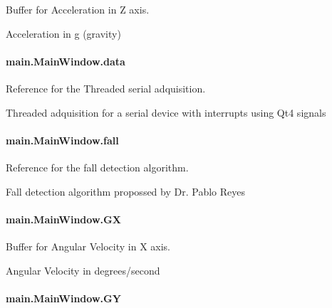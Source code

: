 Buffer for Acceleration in Z axis. 

Acceleration in g (gravity) \hypertarget{classmain_1_1_main_window_af7e14bdf821dcadf59ff9a25fdedacc6}{
\paragraph[{data}]{\setlength{\rightskip}{0pt plus 5cm}main.\-Main\-Window.\-data}}\label{classmain_1_1_main_window_af7e14bdf821dcadf59ff9a25fdedacc6}


Reference for the Threaded serial adquisition. 

Threaded adquisition for a serial device with interrupts using Qt4 signals \hypertarget{classmain_1_1_main_window_ac77d273e1ae89b15533af18cd3501efa}{
\paragraph[{fall}]{\setlength{\rightskip}{0pt plus 5cm}main.\-Main\-Window.\-fall}}\label{classmain_1_1_main_window_ac77d273e1ae89b15533af18cd3501efa}


Reference for the fall detection algorithm. 

Fall detection algorithm propossed by Dr. Pablo Reyes \hypertarget{classmain_1_1_main_window_af9250994236464e4aa37faf090fa52b8}{
\paragraph[{G\-X}]{\setlength{\rightskip}{0pt plus 5cm}main.\-Main\-Window.\-G\-X}}\label{classmain_1_1_main_window_af9250994236464e4aa37faf090fa52b8}


Buffer for Angular Velocity in X axis. 

Angular Velocity in degrees/second \hypertarget{classmain_1_1_main_window_af19db177442479dc778051475277ee8b}{
\paragraph[{G\-Y}]{\setlength{\rightskip}{0pt plus 5cm}main.\-Main\-Window.\-G\-Y}}\label{classmain_1_1_main_window_af19db177442479dc778051475277ee8b}


